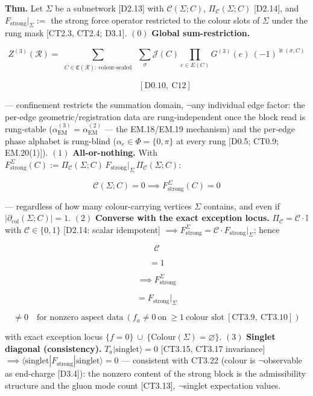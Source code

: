 \begin{theorem}\label{tag:CT3-22a}
\textbf{Thm.} Let $\Sigma$ be a subnetwork [D2.13] with $\mathcal C(\Sigma;C)$, $\Pi_{\mathcal C}(\Sigma;C)$ [D2.14], and $F_{\mathrm{strong}}|_\Sigma:=$ the strong force operator restricted to the colour slots of $\Sigma$ under the rung mask [CT2.3, CT2.4; D3.1]. $(0)$ \textbf{Global sum-restriction.}

\[
Z^{(3)}(\mathcal R)=\sum_{\substack{C\in\mathfrak C(\mathcal R):\ \text{colour-sealed}}}\ \sum_\sigma\mathcal J(C)\!\!\prod_{e\in E(C)}\!\!G^{(3)}(e)\ (-1)^{\aleph(\sigma,C)}
\]

\[
\qquad [\mathrm{D0.10},\ \mathrm{C12}]
\]

— confinement restricts the summation domain, $\neg$any individual edge factor: the per-edge geometric/registration data are rung-independent once the block read is rung-stable ($\alpha_{\mathrm{EM}}^{(3)}=\alpha_{\mathrm{EM}}^{(2)}$ — the EM.18/EM.19 mechanism) and the per-edge phase alphabet is rung-blind ($\alpha_e\in\Phi=\{0,\pi\}$ at every rung [D0.5; CT0.9; EM.20(1)]). $(1)$ \textbf{All-or-nothing.} With $F^\Sigma_{\mathrm{strong}}(C):=\Pi_{\mathcal C}(\Sigma;C)\,F_{\mathrm{strong}}|_\Sigma\,\Pi_{\mathcal C}(\Sigma;C)$:

\[
\mathcal C(\Sigma;C)=0\implies F^\Sigma_{\mathrm{strong}}(C)=0
\]

— regardless of how many colour-carrying vertices $\Sigma$ contains, and even if $|\partial_{\mathrm{col}}(\Sigma;C)|=1$. $(2)$ \textbf{Converse with the exact exception locus.} $\Pi_{\mathcal C}=\mathcal C\cdot\mathbb I$ with $\mathcal C\in\{0,1\}$ [D2.14: scalar idempotent] $\implies F^\Sigma_{\mathrm{strong}}=\mathcal C\cdot F_{\mathrm{strong}}|_\Sigma$; hence

\[
\mathcal C
\]

\[
= 1
\]

\[
\implies F^\Sigma_{\mathrm{strong}}
\]

\[
= F_{\mathrm{strong}}|_\Sigma
\]

\[
\ne 0\quad\text{for nonzero aspect data}\ (f_a\ne0\ \text{on}\ \ge1\ \text{colour slot}\ [\mathrm{CT3.9},\ \mathrm{CT3.10}])
\]

with exact exception locus $\{f=0\}\ \cup\ \{\mathrm{Colour}(\Sigma)=\varnothing\}$. $(3)$ \textbf{Singlet diagonal (consistency).} $T_a|\text{singlet}\rangle=0$ [CT3.15, CT3.17 invariance] $\implies\langle\text{singlet}|F_{\mathrm{strong}}|\text{singlet}\rangle=0$ — consistent with CT3.22 (colour is $\neg$observable as end-charge [D3.4]): the nonzero content of the strong block is the admissibility structure and the gluon mode count [CT3.13], $\neg$singlet expectation values.


\end{theorem}
